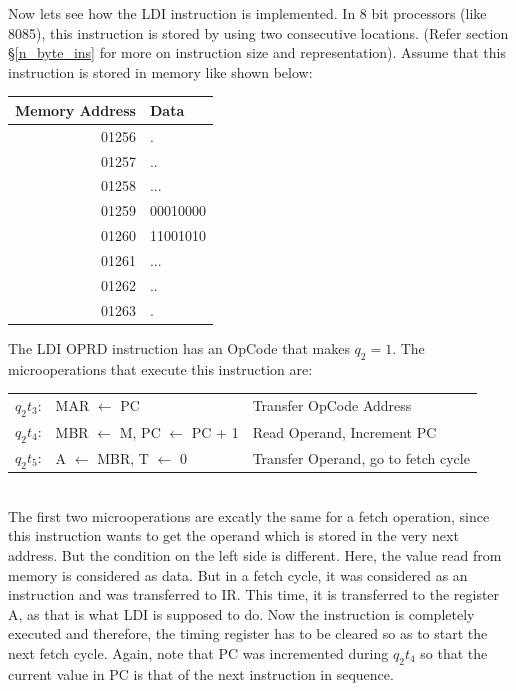 \documentclass{book}
\begin{document}
Now lets see how the LDI instruction is implemented. In 8 bit processors (like 8085), this instruction is stored by using two consecutive locations. (Refer section \S\ref{n_byte_ins} for more on instruction size and representation). Assume that this instruction is stored in memory like shown below:
\begin{center}
\begin{tabular}{r | l}
\textbf{Memory Address} & \textbf{Data}\\
\hline
01256 & .\\
01257 & ..\\
01258 & ...\\
01259 & 00010000\\
01260 & 11001010\\
01261 & ...\\
01262 & ..\\
01263 & .\\
\end{tabular}
\end{center}
The LDI OPRD instruction has an OpCode that makes $q_2=1$. The microoperations that execute this instruction are:
\\[.5cm]
\begin{tabular}{r l l}
$q_2t_3$: & MAR $\leftarrow$ PC & Transfer OpCode Address \\
$q_2t_4$: & MBR $\leftarrow$ M, PC $\leftarrow$ PC + 1 & Read Operand, Increment PC\\
$q_2t_5$: & A $\leftarrow$ MBR, T $\leftarrow$ 0 & Transfer Operand, go to fetch cycle\\
\end{tabular}
\\[.5cm]
The first two microoperations are excatly the same for a fetch operation, since this instruction wants to get the operand which is stored in the very next address. But the condition on the left side is different. Here, the value read from memory is considered as data. But in a fetch cycle, it was considered as an instruction and was transferred to IR. This time, it is transferred to the register A, as that is what LDI is supposed to do. Now the instruction is completely executed and therefore, the timing register has to be cleared so as to start the next fetch cycle. Again, note that PC was incremented during  $q_2t_4$ so that the current value in PC is that of the next instruction in sequence.
\end{document}
